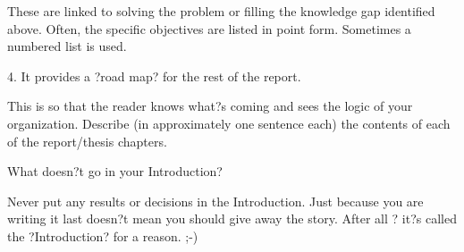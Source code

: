 \documentclass[Report.tex]{subfiles}
\begin{document}
    These are linked to solving the problem or filling the knowledge gap identified above.
    Often, the specific objectives are listed in point form. Sometimes a numbered list is used.

4.       It provides a ?road map? for the rest of the report.

    This is so that the reader knows what?s coming and sees the logic of your organization.
    Describe (in approximately one sentence each) the contents of each of the report/thesis chapters.

What doesn?t go in your Introduction?

    Never put any results or decisions in the Introduction.  Just because you are writing it last doesn?t mean you should give away the story. After all ? it?s called the ?Introduction? for a reason. ;-)
\end{document}
